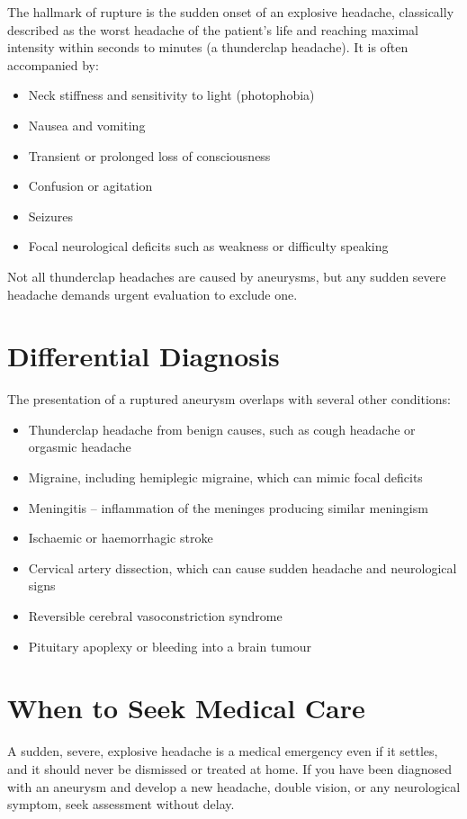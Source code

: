 The hallmark of rupture is the sudden onset of an explosive headache, classically described as the worst headache of the patient's life and reaching maximal intensity within seconds to minutes (a thunderclap headache). It is often accompanied by:

\begin{itemize}
    \item Neck stiffness and sensitivity to light (photophobia)
    \item Nausea and vomiting
    \item Transient or prolonged loss of consciousness
    \item Confusion or agitation
    \item Seizures
    \item Focal neurological deficits such as weakness or difficulty speaking
\end{itemize}

Not all thunderclap headaches are caused by aneurysms, but any sudden severe headache demands urgent evaluation to exclude one.

\section*{Differential Diagnosis}
The presentation of a ruptured aneurysm overlaps with several other conditions:

\begin{itemize}
    \item Thunderclap headache from benign causes, such as cough headache or orgasmic headache
    \item Migraine, including hemiplegic migraine, which can mimic focal deficits
    \item Meningitis -- inflammation of the meninges producing similar meningism
    \item Ischaemic or haemorrhagic stroke
    \item Cervical artery dissection, which can cause sudden headache and neurological signs
    \item Reversible cerebral vasoconstriction syndrome
    \item Pituitary apoplexy or bleeding into a brain tumour
\end{itemize}

\section*{When to Seek Medical Care}
A sudden, severe, explosive headache is a medical emergency even if it settles, and it should never be dismissed or treated at home. If you have been diagnosed with an aneurysm and develop a new headache, double vision, or any neurological symptom, seek assessment without delay.


